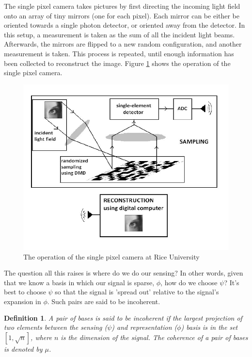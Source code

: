 \documentclass[12pt, a4paper]{article}
\newtheorem{defn}{Definition}
\begin{document}
The single pixel camera takes pictures by first directing the incoming light field onto an array of tiny mirrors (one for each pixel). Each mirror can be either be oriented towards a single photon detector, or oriented away from the detector. In this setup, a measurement is taken as the sum of all the incident light beams. Afterwards, the mirrors are flipped to a new random configuration, and another measurement is taken. This process is repeated, until enough information has been collected to reconstruct the image. Figure \ref{singlepixelcamera} shows the operation of the single pixel camera.

\begin{figure}[h]
\centering
\includegraphics[height = 7 cm]{singlepixel.png}
\caption{The operation of the single pixel camera at Rice University \cite{singlepixelimaging}}
\label{singlepixelcamera}
\end{figure}



The question all this raises is where do we do our sensing? In other words, given that we know a basis in which our signal is sparse, \(\phi\), how do we choose \(\psi\)? It's best to choose \(\psi\) so that the signal is 'spread out' relative to the signal's expansion in \(\phi\). Such pairs are said to be incoherent. 

\begin{defn}
A pair of bases is said to be incoherent if the largest projection of two elements between the sensing (\(\psi\)) and representation (\(\phi\)) basis  is in the set \( [1 , \sqrt{n}] \), where \( n \) is the dimension of the signal. The coherence of a pair of bases is denoted by \(\mu\).
\end{defn}
\end{document}
